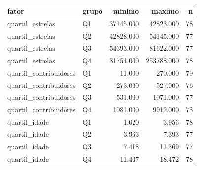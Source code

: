 \begin{tabular}{llrrr}
\toprule
fator & grupo & minimo & maximo & n \\
\midrule
quartil_estrelas & Q1 & 37145.000 & 42823.000 & 78 \\
quartil_estrelas & Q2 & 42828.000 & 54145.000 & 77 \\
quartil_estrelas & Q3 & 54393.000 & 81622.000 & 77 \\
quartil_estrelas & Q4 & 81754.000 & 253788.000 & 78 \\
quartil_contribuidores & Q1 & 11.000 & 270.000 & 79 \\
quartil_contribuidores & Q2 & 273.000 & 527.000 & 76 \\
quartil_contribuidores & Q3 & 531.000 & 1071.000 & 77 \\
quartil_contribuidores & Q4 & 1081.000 & 9912.000 & 78 \\
quartil_idade & Q1 & 1.020 & 3.956 & 78 \\
quartil_idade & Q2 & 3.963 & 7.393 & 77 \\
quartil_idade & Q3 & 7.418 & 11.369 & 77 \\
quartil_idade & Q4 & 11.437 & 18.472 & 78 \\
\bottomrule
\end{tabular}
